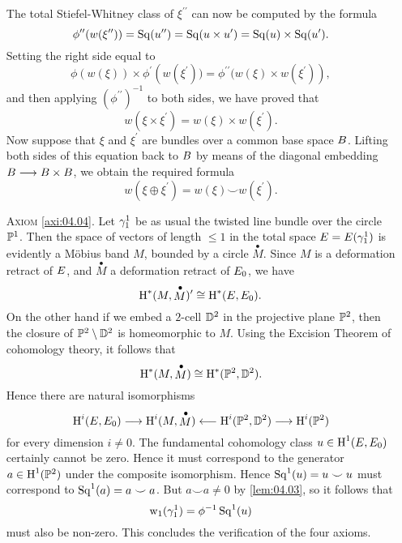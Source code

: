 \documentclass[../main]{subfiles}
\begin{document}
\begin{enumerate}
The total Stiefel-Whitney class of $\xi^{\prime \prime}$ can now be computed by the formula
\[
\phi^{\prime \prime}(w(\xi^{\prime \prime}))=\operatorname{Sq}(u^{\prime \prime})=\operatorname{Sq}(u \times u^{\prime})=\operatorname{Sq}(u) \times \operatorname{Sq}(u^{\prime}).
\]
Setting the right side equal to
\[
\phi\left(w(\xi)\right) \times \phi^{\prime}\left(w(\xi^{\prime}))=\phi^{\prime \prime}(w(\xi) \times w(\xi^{\prime})\right),
\]
and then applying $(\phi^{\prime \prime})^{-1}$ to both sides, we have proved that
\[
w(\xi \times \xi^{\prime})=w(\xi) \times w(\xi^{\prime}).
\]
Now suppose that $\xi$ and $\xi^{\prime}$ are bundles over a common base space $B$. Lifting both sides of this equation back to $B$ by means of the diagonal embedding $B  \longrightarrow B \times B $, we obtain the required formula
\[
w(\xi \oplus \xi^{\prime})=w(\xi) \smile w(\xi^{\prime}).
\]
\item[\textsc{Axiom} \ref{axi:04.04}.]  Let $\gamma_{1}^{1}$ be as usual the twisted line bundle over the circle $\mathbb{P}^{1}$. Then the space of vectors of length $\leq 1$ in the total space $E=E(\gamma_{1}^{1})$ is evidently a M\"obius band $M$, bounded by a circle $\stackrel{\bullet}{M}$. Since $M$ is a deformation retract of $E$, and $\stackrel{\bullet}{M}$ a deformation retract of $E_{0}$, we have
\[
\operatorname{H}^{*}(M, \stackrel{\bullet}{M})^{\prime} \cong \operatorname{H}^{*}(E, E_{0}).
\]
On the other hand if we embed a $2$-cell $\mathbb{D}^{2}$ in the projective plane $\mathbb{P}^{2}$, then the closure of $\mathbb{P}^{2}\setminus\mathbb{D}^{2}$ is homeomorphic to $M$. Using the Excision Theorem of cohomology theory, it follows that
\[
\operatorname{H}^{*}(M, \stackrel{\bullet}{M}) \cong \operatorname{H}^{*}(\mathbb{P}^{2}, \mathbb{D}^{2}).
\]
Hence there are natural isomorphisms
\[
\operatorname{H}^{i}(E, E_{0}) \longrightarrow \operatorname{H}^{i}(M, \stackrel{\bullet}{M}) \longleftarrow \operatorname{H}^{i}(\mathbb{P}^{2}, \mathbb{D}^{2}) \longrightarrow \operatorname{H}^{i}(\mathbb{P}^{2})
\]
for every dimension $i \neq 0$. The fundamental cohomology class $u \in \operatorname{H}^{1}(E, E_{0})$ certainly cannot be zero. Hence it must correspond to the generator \newline$a \in \operatorname{H}^{1}(\mathbb{P}^{2})$ under the composite isomorphism. Hence $\operatorname{Sq}^{1}(u)=u \smile u$ must correspond to $\operatorname{Sq}^{1}(a)=a \smile a$. But $a \smile a \neq 0$ by \ref{lem:04.03}, so it follows that
\[
\operatorname{w}_{1}(\gamma_{1}^{1})=\phi^{-1} \operatorname{Sq}^{1}(u)
\]
must also be non-zero. This concludes the verification of the four axioms.
\end{enumerate}
\end{document}
